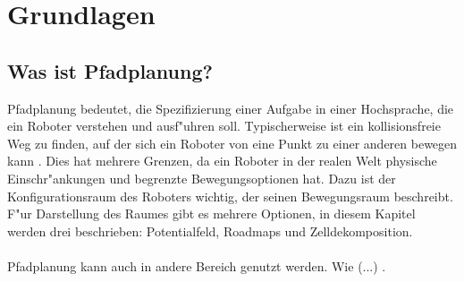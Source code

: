 \chapter{Grundlagen}

\section{Was ist Pfadplanung?}
Pfadplanung bedeutet, die Spezifizierung einer Aufgabe in einer Hochsprache, die ein Roboter verstehen und ausf"uhren soll. Typischerweise ist ein kollisionsfreie Weg zu finden, auf der sich ein Roboter von eine Punkt zu einer anderen bewegen kann \cite[~S. 1]{Principles:05}. Dies hat mehrere Grenzen, da ein Roboter in der realen Welt physische Einschr"ankungen und begrenzte Bewegungsoptionen hat. Dazu ist der Konfigurationsraum des Roboters wichtig, der seinen Bewegungsraum beschreibt. F"ur Darstellung des Raumes gibt es mehrere Optionen, in diesem Kapitel werden drei beschrieben: Potentialfeld, Roadmaps und Zelldekomposition.
\\\\
Pfadplanung kann auch in andere Bereich genutzt werden. Wie (...) . 

